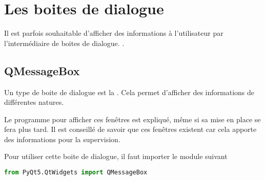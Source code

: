 \section{Les boites de dialogue}

Il est parfois souhaitable d'afficher des informations à l'utilisateur par l'intermédiaire de boites de dialogue. \newline.

\subsection{QMessageBox}

Un type de boite de dialogue est la . Cela permet d'afficher des informations de différentes natures.\newline

Le programme pour afficher ces fenêtres est expliqué, même si sa mise en place se fera plus tard. \newlineIl
Il est conseillé de savoir que ces fenêtres existent car cela apporte des informations pour la supervision.\newline

Pour utiliser cette boite de dialogue, il faut importer le module suivant
\begin{lstlisting}[language=Python]
from PyQt5.QtWidgets import QMessageBox
\end{lstlisting}


